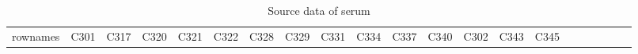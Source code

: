\documentclass[
]{article}
\begin{document}
\begin{longtable}[]{@{}lllllllllllllllllllll@{}}
\caption{\label{tab:source-data-of-serum}Source data of serum}\tabularnewline
\toprule
\begin{minipage}[b]{0.03\columnwidth}\raggedright
rownames\strut
\end{minipage} & \begin{minipage}[b]{0.03\columnwidth}\raggedright
C301\strut
\end{minipage} & \begin{minipage}[b]{0.03\columnwidth}\raggedright
C317\strut
\end{minipage} & \begin{minipage}[b]{0.03\columnwidth}\raggedright
C320\strut
\end{minipage} & \begin{minipage}[b]{0.03\columnwidth}\raggedright
C321\strut
\end{minipage} & \begin{minipage}[b]{0.03\columnwidth}\raggedright
C322\strut
\end{minipage} & \begin{minipage}[b]{0.03\columnwidth}\raggedright
C328\strut
\end{minipage} & \begin{minipage}[b]{0.03\columnwidth}\raggedright
C329\strut
\end{minipage} & \begin{minipage}[b]{0.03\columnwidth}\raggedright
C331\strut
\end{minipage} & \begin{minipage}[b]{0.03\columnwidth}\raggedright
C334\strut
\end{minipage} & \begin{minipage}[b]{0.03\columnwidth}\raggedright
C337\strut
\end{minipage} & \begin{minipage}[b]{0.03\columnwidth}\raggedright
C340\strut
\end{minipage} & \begin{minipage}[b]{0.03\columnwidth}\raggedright
C302\strut
\end{minipage} & \begin{minipage}[b]{0.03\columnwidth}\raggedright
C343\strut
\end{minipage} & \begin{minipage}[b]{0.03\columnwidth}\raggedright
C345\strut
\end{minipage} & \begin{minipage}[b]{0.03\columnwidth}\raggedright

\end{minipage}
\end{longtable}
\end{document}
